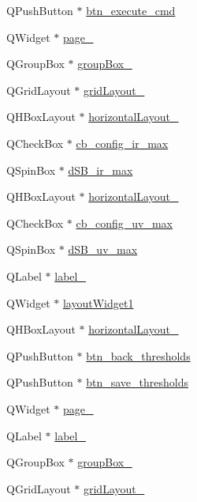 \begin{DoxyCompactItemize}
Q\+Push\+Button $\ast$ \hyperlink{a00027_a9ea50d44e38316e4203933698cbc14a6}{btn\+\_\+execute\+\_\+cmd}
\item 
Q\+Widget $\ast$ \hyperlink{a00027_ac682cb2a9b686ca7c3d29771ad9ccb48}{page\+\_}
\item 
Q\+Group\+Box $\ast$ \hyperlink{a00027_ad8a919e5634add9c41bfc319cb9fd338}{group\+Box\+\_}
\item 
Q\+Grid\+Layout $\ast$ \hyperlink{a00027_a8731b71c513ff94baf59614807823c5d}{grid\+Layout\+\_}
\item 
Q\+H\+Box\+Layout $\ast$ \hyperlink{a00027_ae183387a7d233b437a637b403ba39ffd}{horizontal\+Layout\+\_}
\item 
Q\+Check\+Box $\ast$ \hyperlink{a00027_ae78fd3c777d081ab1ec1d0142bec3320}{cb\+\_\+config\+\_\+ir\+\_\+max}
\item 
Q\+Spin\+Box $\ast$ \hyperlink{a00027_a220706f1fd93857145032c897e55d9e3}{d\+S\+B\+\_\+ir\+\_\+max}
\item 
Q\+H\+Box\+Layout $\ast$ \hyperlink{a00027_a14c9d4842c3e97e16e7873ef0aecdb1e}{horizontal\+Layout\+\_}
\item 
Q\+Check\+Box $\ast$ \hyperlink{a00027_a13ce5fddc83683d7b8b717f0b9a4e2cf}{cb\+\_\+config\+\_\+uv\+\_\+max}
\item 
Q\+Spin\+Box $\ast$ \hyperlink{a00027_aa2872ada374dace81c4f1cc41d8e244d}{d\+S\+B\+\_\+uv\+\_\+max}
\item 
Q\+Label $\ast$ \hyperlink{a00027_ad6bab8fb8903b8f41afea1218ee52695}{label\+\_}
\item 
Q\+Widget $\ast$ \hyperlink{a00027_aab31b3dec8d767525dea6f163e029e48}{layout\+Widget1}
\item 
Q\+H\+Box\+Layout $\ast$ \hyperlink{a00027_a2071e5a4c77a64f74d74ac246bbc683c}{horizontal\+Layout\+\_}
\item 
Q\+Push\+Button $\ast$ \hyperlink{a00027_a5a4e0ac94bd22955cc41bcc276a04278}{btn\+\_\+back\+\_\+thresholds}
\item 
Q\+Push\+Button $\ast$ \hyperlink{a00027_ac265ae0ccaa1154deaa634d19415f775}{btn\+\_\+save\+\_\+thresholds}
\item 
Q\+Widget $\ast$ \hyperlink{a00027_ad52b1b3da7f1a695b9d3b521254c961d}{page\+\_}
\item 
Q\+Label $\ast$ \hyperlink{a00027_a663f728e6244926a795c6e6892673b1d}{label\+\_}
\item 
Q\+Group\+Box $\ast$ \hyperlink{a00027_a40a9931365fd3679efec4f0112073db2}{group\+Box\+\_}
\item 
Q\+Grid\+Layout $\ast$ \hyperlink{a00027_a4c2d544352d423a361b8ab2e1d5636ec}{grid\+Layout\+\_}

\end{DoxyCompactItemize}
